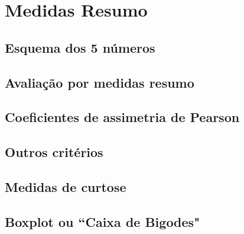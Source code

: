 \section{Medidas Resumo}

	\subsection{Esquema dos 5 números}

	\subsection{Avaliação por medidas resumo}

	\subsection{Coeficientes de assimetria de Pearson}

	\subsection{Outros critérios}

	\subsection{Medidas de curtose}

	\subsection{Boxplot ou ``Caixa de Bigodes"}